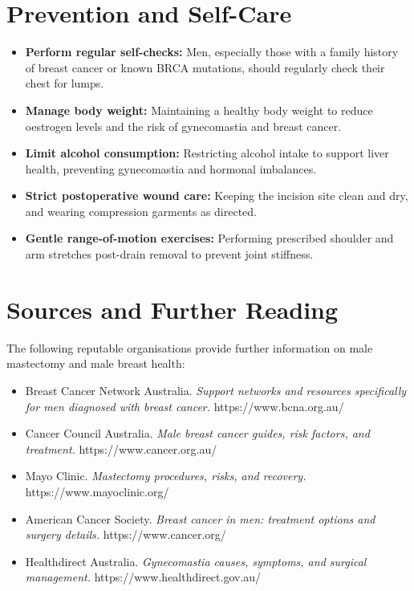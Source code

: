\section*{Prevention and Self-Care}
\begin{itemize}
    \item \textbf{Perform regular self-checks:} Men, especially those with a family history of breast cancer or known BRCA mutations, should regularly check their chest for lumps.
    \item \textbf{Manage body weight:} Maintaining a healthy body weight to reduce oestrogen levels and the risk of gynecomastia and breast cancer.
    \item \textbf{Limit alcohol consumption:} Restricting alcohol intake to support liver health, preventing gynecomastia and hormonal imbalances.
    \item \textbf{Strict postoperative wound care:} Keeping the incision site clean and dry, and wearing compression garments as directed.
    \item \textbf{Gentle range-of-motion exercises:} Performing prescribed shoulder and arm stretches post-drain removal to prevent joint stiffness.
\end{itemize}

\section*{Sources and Further Reading}
The following reputable organisations provide further information on male mastectomy and male breast health:
\begin{itemize}
    \item Breast Cancer Network Australia. \textit{Support networks and resources specifically for men diagnosed with breast cancer.} https://www.bcna.org.au/
    \item Cancer Council Australia. \textit{Male breast cancer guides, risk factors, and treatment.} https://www.cancer.org.au/
    \item Mayo Clinic. \textit{Mastectomy procedures, risks, and recovery.} https://www.mayoclinic.org/
    \item American Cancer Society. \textit{Breast cancer in men: treatment options and surgery details.} https://www.cancer.org/
    \item Healthdirect Australia. \textit{Gynecomastia causes, symptoms, and surgical management.} https://www.healthdirect.gov.au/
\end{itemize}
